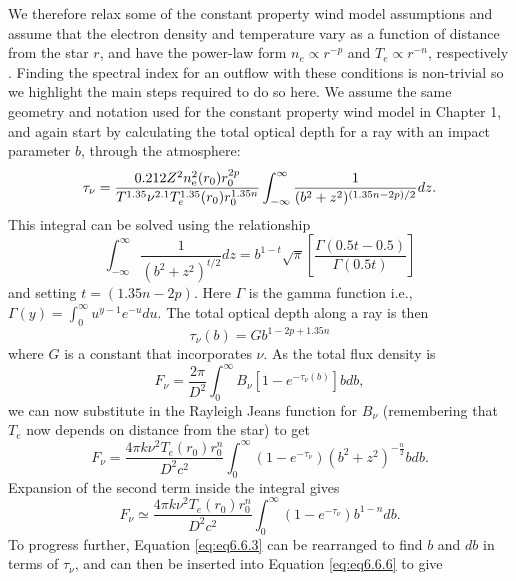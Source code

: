 We therefore relax some of the constant property wind model assumptions and assume that the electron density and temperature vary as a function of distance from the star $r$, and have the power-law form $n_{e} \propto r^{-p}$ and $T_{e} \propto r^{-n}$, respectively \citep[e.g.,][]{seaquist_1987}. Finding the spectral index for an outflow with these conditions is non-trivial so we highlight the main steps required to do so here. We assume the same geometry and notation used for the constant property wind model in Chapter 1, and again start by calculating the total optical depth for a ray with an impact parameter $b$, through the atmosphere:
\begin{equation}
\tau_{\nu} =\frac{0.212Z^2n^2_{\rm{e}}(r_{0})r_{0}^{2p}}{T^{1.35}\nu^{2.1}T_{e}^{1.35}(r_{0})r_{0}^{1.35n}}\int ^{\infty}_{-\infty} \frac{1}{(b^2 + z^2)^{(1.35n -2p)/2}} dz.
\label{eq:eq6.6.1}
\end{equation}
This integral can be solved using the relationship
\begin{equation}
\int ^{\infty}_{-\infty} \frac{1}{(b^2+z^2)^{t/2}} dz = b^{1-t}\sqrt{\pi}\left[\frac{\Gamma(0.5t-0.5)}{\Gamma (0.5t)} \right]
\label{eq:eq6.6.2}
\end{equation}
and setting $t=(1.35n -2p)$. Here $\Gamma$ is the gamma function i.e., $\Gamma (y)= \int ^{\infty}_{0} u^{y-1}e^{-u}du$. The total optical depth along a ray is then 
\begin{equation}
\tau_{\nu}(b) = Gb^{1-2p +1.35n}
\label{eq:eq6.6.3}
\end{equation}
where $G$ is a constant that incorporates $\nu$. As the total flux density is
\begin{equation}
F_{\nu} = \frac{2\pi}{D^2}\int ^{\infty}_{0} B_{\nu}[1 - e^{-\tau_{\nu}(b)}]bdb,
\label{eq:eq6.6.4}
\end{equation}
we can now substitute in the Rayleigh Jeans function for $B_{\nu}$ (remembering that $T_{e}$ now depends on distance from the star) to get
\begin{equation}
F_{\nu}=\frac{4\pi k\nu^2 T_{e}(r_{0})r_{0}^{n}}{D^2c^2}\int ^{\infty}_{0}(1-e^{-\tau _{\nu}})(b^2+z^2)^{-\frac{n}{2}}bdb.
\label{eq:eq6.6.5}
\end{equation}
Expansion of the second term inside the integral gives
\begin{equation}
F_{\nu} \simeq \frac{4\pi k\nu^2 T_{e}(r_{0})r_{0}^{n}}{D^2c^2}\int ^{\infty}_{0}(1-e^{-\tau _{\nu}})b^{1-n}db.
\label{eq:eq6.6.6}
\end{equation}
To progress further, Equation \ref{eq:eq6.6.3} can be rearranged to find $b$ and $db$ in terms of $\tau _{\nu}$, and can then be inserted into Equation \ref{eq:eq6.6.6} to give
